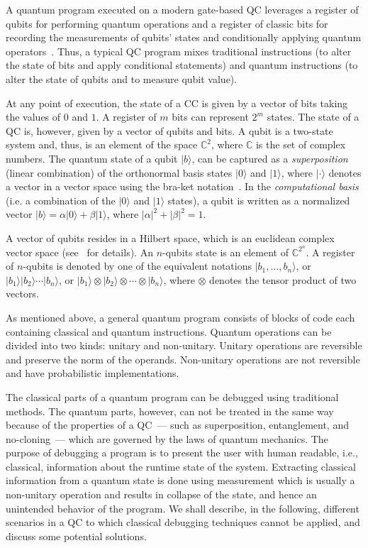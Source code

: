 \documentclass[11pt]{article}
\theoremstyle{plain}
\theoremstyle{definition}
\newcommand{\ldbrac}[1]{\lvert#1\rangle}
\newcommand{\abs}[1]{\left\vert#1\right\vert}
\def\C{\ensuremath{\mathbb{C}}}
\begin{document}
A quantum program executed on a modern gate-based QC leverages a register of qubits for performing 
quantum operations and a register of classic bits for recording the measurements of qubits' states 
and conditionally applying quantum operators~\cite{cross2017open}. Thus, a typical QC program mixes 
traditional instructions (to alter the state of bits and apply conditional statements) and quantum 
instructions (to alter the state of qubits and to measure qubit value).

At any point of execution, the state of a CC is given by a vector of bits taking the values of $0$ 
and $1$. A register of $m$ bits can represent $2^m$ states. The state of a QC is, however, given by 
a vector of qubits and bits. 
A qubit is a two-state system and, thus, is an element of the space $\C^2$, where $\C$ is the set 
of complex numbers.  The quantum state of a qubit $\ldbrac{b}$, can be captured as a 
\textit{superposition} (linear combination) of the orthonormal basis states $\ldbrac{0}$ and 
$\ldbrac{1}$, where $\ldbrac{\cdot}$ denotes a vector in a vector space using the bra-ket 
notation~\cite{kaye2007introduction}. In the 
\textit{computational basis} (i.e. a combination of the $\ldbrac{0}$ and $\ldbrac{1}$ states), a 
qubit is written as a normalized vector $\ldbrac{b} = \alpha \ldbrac{0} + \beta \ldbrac{1}$, where 
$\abs{\alpha}^2 + \abs{\beta}^2 = 1$. 

A vector of qubits resides in a Hilbert space, which is an euclidean complex vector space 
(see~\cite{watrous2018theory} for details). An $n$-qubits state  is an element of $\C^{2^n}$.
A register of $n$-qubits is denoted by one of the equivalent notations $\ldbrac{b_1, \dots, b_n}$, 
or $\ldbrac{b_1} \ldbrac{b_2} \cdots \ldbrac{b_n}$, or $\ldbrac{b_1} \otimes \ldbrac{b_2} \otimes 
\cdots \otimes \ldbrac{b_n}$,
where $\otimes$ denotes the tensor product of two vectors.

As mentioned above, a general quantum program consists of blocks of code each containing classical 
and quantum instructions. 
Quantum operations can be divided into two kinds: unitary and non-unitary. Unitary operations are 
reversible and preserve the norm of the operands. Non-unitary operations are not reversible and 
have 
probabilistic implementations. 

The classical parts of a quantum program can be debugged using traditional methods. The quantum 
parts, 
however, can not be treated in the same way because of the properties of a QC~--- such as 
superposition, 
entanglement, and no-cloning~--- which are governed by the laws of quantum mechanics. The purpose 
of 
debugging a program is to present the user with human readable, i.e., classical, information about 
the runtime state of the system. Extracting classical information from a quantum state is done 
using 
measurement which is usually a non-unitary operation and results in collapse of the state, and 
hence 
an unintended behavior of the program. We shall describe, in the following, different scenarios in 
a 
QC to which classical debugging techniques cannot be applied, and discuss some potential solutions.
\end{document}
